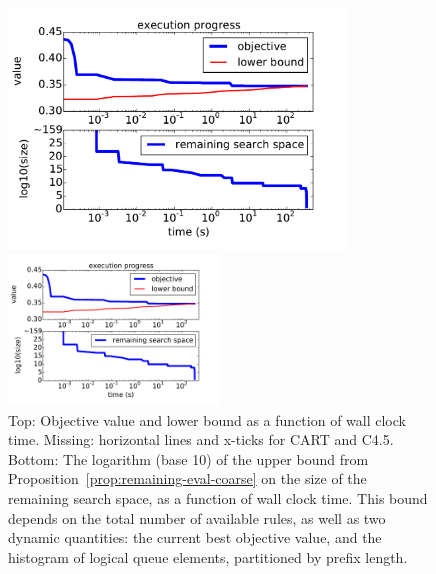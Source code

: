 \begin{figure}[t!]
\begin{center}
\begin{arxiv}
\includegraphics[width=0.8\textwidth]{figs/ela_compas-remaining-space.pdf}
\end{arxiv}
\begin{kdd}
\includegraphics[width=0.5\textwidth]{figs/ela_compas-remaining-space.pdf}
\end{kdd}
\end{center}
\caption{Top: Objective value and lower bound as a function of wall clock time.
%
Missing: horizontal lines and x-ticks for CART and C4.5.
%
Bottom:
The logarithm (base 10) of the upper bound
from Proposition~\ref{prop:remaining-eval-coarse}
on the size of the remaining search space,
as a function of wall clock time.
%
This bound depends on the total number of available rules,
as well as two dynamic quantities:
the current best objective value,
and the histogram of logical queue elements,
partitioned by prefix length.}
\label{fig:objective}
\end{figure}

